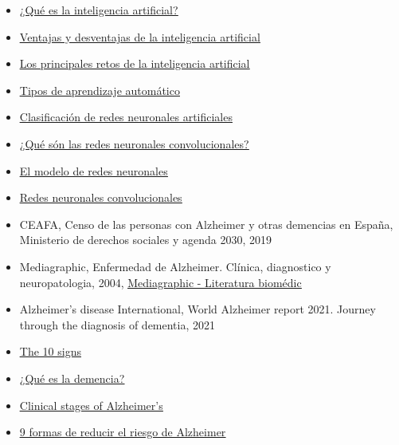 \documentclass[a4paper,12pt]{article}
\begin{document}
\begin{itemize}
    \item \href{https://www.iberdrola.com/innovacion/que-es-inteligencia-artificial}{\underline{¿Qué es la inteligencia artificial?}}
    \item \href{https://nexusintegra.io/es/ventajas-y-desventajas-de-la-inteligencia-artificial/}{\underline{Ventajas y desventajas de la inteligencia artificial}}
    \item \href{https://www.santander.com/es/sala-de-comunicacion/dp/los-principales-retos-de-la-inteligencia-artificial}{\underline{Los principales retos de la inteligencia artificial}}
    \item \href{https://keepcoding.io/blog/tipos-de-aprendizaje-automatico/}{\underline{Tipos de aprendizaje automático}}
    \item \href{https://www.diegocalvo.es/clasificacion-de-redes-neuronales-artificiales/}{\underline{Clasificación de redes neuronales artificiales}}
    \item \href{https://keepcoding.io/blog/redes-neuronales-convolucionales/#Que_son_las_Redes_Neuronales_Convolucionales}{\underline{¿Qué són las redes neuronales convolucionales?}}
    \item \href{https://www.ibm.com/docs/es/spss-modeler/saas?topic=networks-neural-model}{\underline{El modelo de redes neuronales}}
    \item \href{https://www.juanbarrios.com/redes-neurales-convolucionales/ }{\underline{Redes neuronales convolucionales}}
    \item CEAFA, Censo de las personas con Alzheimer y otras demencias en España, Ministerio de derechos sociales y agenda 2030, 2019
    \item Mediagraphic, Enfermedad de Alzheimer. Clínica, diagnostico y neuropatologia, 2004, \href{https://www.medigraphic.com/newMedi/}{\underline{Mediagraphic - Literatura biomédic}}
    \item Alzheimer’s disease International, World Alzheimer report 2021. Journey through the diagnosis of dementia, 2021
    \item \href{https://www.alz.org/alzheimers-dementia/10_signs}{\underline{The 10 signs}}
    \item \href{https://www.cdc.gov/aging/spanish/features/dementia.html}{\underline{¿Qué es la demencia?}}
    \item \href{https://www.alzinfo.org/understand-alzheimers/clinical-stages-of-alzheimers/}{\underline{Clinical stages of Alzheimer's}}
    \item \href{https://www.ceafa.es/es/que-comunicamos/noticias/9-formas-de-reducir-el-riesgo-de-alzheimer}{\underline{9 formas de reducir el riesgo de Alzheimer}}

\end{itemize}
\end{document}
